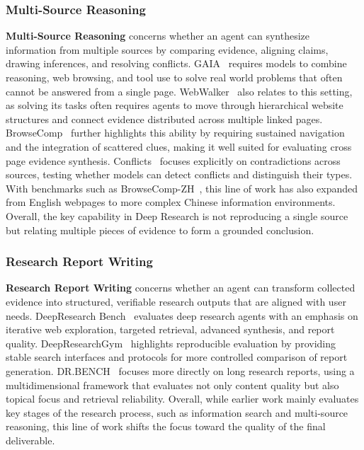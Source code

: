 \documentclass{llmxive}
\begin{document}
\subsubsection{Multi-Source Reasoning}
\label{Multi-Source Reasoning}
\textbf{Multi-Source Reasoning} concerns whether an agent can synthesize information from multiple sources by comparing evidence, aligning claims, drawing inferences, and resolving conflicts. GAIA~\cite{GAIA} requires models to combine reasoning, web browsing, and tool use to solve real world problems that often cannot be answered from a single page. 
WebWalker~\cite{WebWalker} also relates to this setting, as solving its tasks often requires agents to move through hierarchical website structures and connect evidence distributed across multiple linked pages. 
BrowseComp~\cite{BrowseComp} further highlights this ability by requiring sustained navigation and the integration of scattered clues, making it well suited for evaluating cross page evidence synthesis. 
Conflicts~\cite{Conflicts} focuses explicitly on contradictions across sources, testing whether models can detect conflicts and distinguish their types. With benchmarks such as BrowseComp-ZH~\cite{BrowseComp-ZH}, this line of work has also expanded from English webpages to more complex Chinese information environments. Overall, the key capability in Deep Research is not reproducing a single source but relating multiple pieces of evidence to form a grounded conclusion.


\subsubsection{Research Report Writing}
\label{Research Report Writing}
\textbf{Research Report Writing} concerns whether an agent can transform collected evidence into structured, verifiable research outputs that are aligned with user needs. DeepResearch Bench~\cite{DeepResearch-Bench} evaluates deep research agents with an emphasis on iterative web exploration, targeted retrieval, advanced synthesis, and report quality. DeepResearchGym~\cite{DeepResearchGym} highlights reproducible evaluation by providing stable search interfaces and protocols for more controlled comparison of report generation. DR.BENCH~\cite{DR_BENCH} focuses more directly on long research reports, using a multidimensional framework that evaluates not only content quality but also topical focus and retrieval reliability. Overall, while earlier work mainly evaluates key stages of the research process, such as information search and multi-source reasoning, this line of work shifts the focus toward the quality of the final deliverable.
\end{document}
